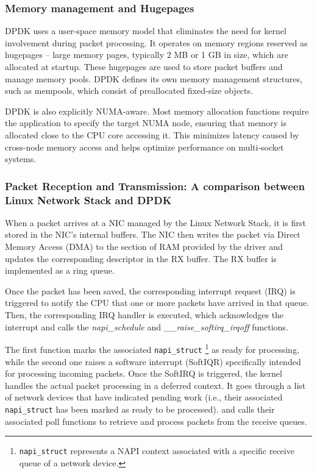 \subsubsection{Memory management and Hugepages}
DPDK uses a user-space memory model that eliminates the need for kernel involvement during packet processing. 
It operates on memory regions reserved as hugepages -- large memory pages, typically 2 MB or 1 GB in size, which are allocated at startup. 
These hugepages are used to store packet buffers and manage memory pools. 
DPDK defines its own memory management structures, such as mempools, which consist of preallocated fixed-size objects. 

DPDK is also explicitly NUMA-aware. Most memory allocation functions require the application to specify the target NUMA node, ensuring that memory is allocated close to the CPU core accessing it. 
This minimizes latency caused by cross-node memory access and helps optimize performance on multi-socket systems.~\cite{burakov2019memory}

\subsubsection{Packet Reception and Transmission: A comparison between Linux Network Stack and DPDK}
When a packet arrives at a NIC managed by the Linux Network Stack, it is first stored in the NIC’s internal buffers. 
The NIC then writes the packet via Direct Memory Access (DMA) to the section of RAM provided by the driver and updates the corresponding descriptor in the RX buffer. 
The RX buffer is implemented as a ring queue.

Once the packet has been saved, the corresponding interrupt request (IRQ) is triggered to notify the CPU that one or more packets have arrived in that queue. 
Then, the corresponding IRQ handler is executed, which acknowledges the interrupt and calls the \textit{napi\_schedule} and \textit{\_\_raise\_softirq\_irqoff} functions.

\newpage
The first function marks the associated \texttt{napi\_struct}%
\footnote{\texttt{napi\_struct} represents a NAPI context associated with a specific receive queue of a network device.}
 as ready for processing, while the second one raises a software interrupt (SoftIQR) specifically intended for processing incoming packets. 
Once the SoftIRQ is triggered, the kernel handles the actual packet processing in a deferred context. 
It goes through a list of network devices that have indicated pending work (i.e., their associated \texttt{napi\_struct} has been marked as ready to be processed).
and calls their associated poll functions to retrieve and process packets from the receive queues.

